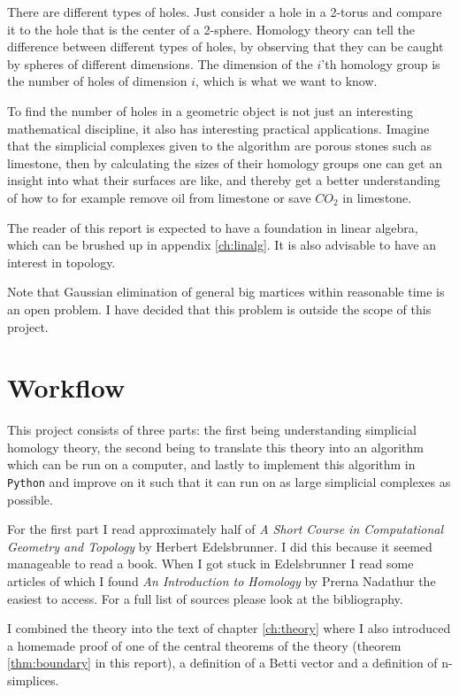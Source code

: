 \documentclass[11pt,a4paper,twoside]{report}
\begin{document}
There are different types of holes. Just consider a hole in a 2-torus and compare it to the hole that is the center of a 2-sphere. Homology theory can tell the difference between different types of holes, by observing that they can be caught by spheres of different dimensions. The dimension of the $i$'th homology group is the number of holes of dimension $i$, which is what we want to know.

To find the number of holes in a geometric object is not just an interesting mathematical discipline, it also has interesting practical applications. Imagine that the simplicial complexes given to the algorithm are porous stones such as limestone, then by calculating the sizes of their homology groups one can get an insight into what their surfaces are like, and thereby get a better understanding of how to for example remove oil from limestone or save $CO_2$ in limestone. 

The reader of this report is expected to have a foundation in linear algebra, which can be brushed up in appendix \ref{ch:linalg}. It is also advisable to have an interest in topology.

Note that Gaussian elimination of general big martices within reasonable time is an open problem. I have decided that this problem is outside the scope of this project.
\newpage
\section*{Workflow}
This project consists of three parts: the first being understanding simplicial homology theory, the second being to translate this theory into an algorithm which can be run on a computer, and lastly to implement this algorithm in \texttt{Python} and improve on it such that it can run on as large simplicial complexes as possible.

For the first part I read approximately half of \emph{A Short Course in Computational Geometry and Topology} by Herbert Edelsbrunner\cite{Edelsbrunner}. I did this because it seemed manageable to read a book. When I got stuck in Edelsbrunner I read some articles of which I found \emph{An Introduction to Homology} by Prerna Nadathur \cite{Nadathur} the easiest to access. For a full list of sources please look at the bibliography.

I combined the theory into the text of chapter \ref{ch:theory} where I also introduced a homemade proof of one of the central theorems of the theory (theorem \ref{thm:boundary} in this report), a definition of a Betti vector and a definition of n-simplices.
\end{document}
